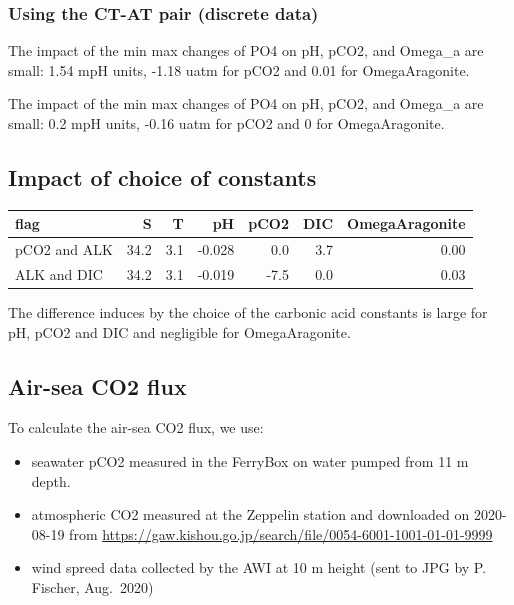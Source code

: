 \documentclass[
]{article}
\providecommand{\tightlist}{%
  \setlength{\itemsep}{0pt}\setlength{\parskip}{0pt}}
\begin{document}
\hypertarget{using-the-ct-at-pair-discrete-data}{%
\subsubsection{Using the CT-AT pair (discrete
data)}\label{using-the-ct-at-pair-discrete-data}}

The impact of the min max changes of PO4 on pH, pCO2, and Omega\_a are
small: 1.54 mpH units, -1.18 uatm for pCO2 and 0.01 for OmegaAragonite.

The impact of the min max changes of PO4 on pH, pCO2, and Omega\_a are
small: 0.2 mpH units, -0.16 uatm for pCO2 and 0 for OmegaAragonite.

\hypertarget{impact-of-choice-of-constants}{%
\subsection{Impact of choice of
constants}\label{impact-of-choice-of-constants}}

\begin{longtable}[]{@{}lrrrrrr@{}}
\toprule
flag & S & T & pH & pCO2 & DIC & OmegaAragonite\tabularnewline
\midrule
\endhead
pCO2 and ALK & 34.2 & 3.1 & -0.028 & 0.0 & 3.7 & 0.00\tabularnewline
ALK and DIC & 34.2 & 3.1 & -0.019 & -7.5 & 0.0 & 0.03\tabularnewline
\bottomrule
\end{longtable}

The difference induces by the choice of the carbonic acid constants is
large for pH, pCO2 and DIC and negligible for OmegaAragonite.

\hypertarget{air-sea-co2-flux}{%
\subsection{Air-sea CO2 flux}\label{air-sea-co2-flux}}

To calculate the air-sea CO2 flux, we use:

\begin{itemize}
\tightlist
\item
  seawater pCO2 measured in the FerryBox on water pumped from 11 m
  depth.
\item
  atmospheric CO2 measured at the Zeppelin station and downloaded on
  2020-08-19 from
  \url{https://gaw.kishou.go.jp/search/file/0054-6001-1001-01-01-9999}
\item
  wind spreed data collected by the AWI at 10 m height (sent to JPG by
  P. Fischer, Aug.~2020)
\end{itemize}
\end{document}
